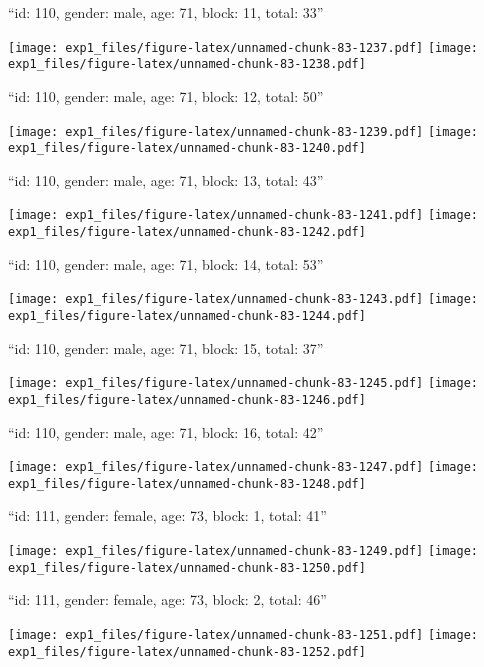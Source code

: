 \documentclass[11pt,,]{article}
\begin{document}
\newpage
[1] 

``id: 110, gender: male, age: 71, block: 11, total: 33''

\texttt{[image: exp1\_files/figure-latex/unnamed-chunk-83-1237.pdf]}
\texttt{[image: exp1\_files/figure-latex/unnamed-chunk-83-1238.pdf]}

\newpage
[1] 

``id: 110, gender: male, age: 71, block: 12, total: 50''

\texttt{[image: exp1\_files/figure-latex/unnamed-chunk-83-1239.pdf]}
\texttt{[image: exp1\_files/figure-latex/unnamed-chunk-83-1240.pdf]}

\newpage
[1] 

``id: 110, gender: male, age: 71, block: 13, total: 43''

\texttt{[image: exp1\_files/figure-latex/unnamed-chunk-83-1241.pdf]}
\texttt{[image: exp1\_files/figure-latex/unnamed-chunk-83-1242.pdf]}

\newpage
[1] 

``id: 110, gender: male, age: 71, block: 14, total: 53''

\texttt{[image: exp1\_files/figure-latex/unnamed-chunk-83-1243.pdf]}
\texttt{[image: exp1\_files/figure-latex/unnamed-chunk-83-1244.pdf]}

\newpage
[1] 

``id: 110, gender: male, age: 71, block: 15, total: 37''

\texttt{[image: exp1\_files/figure-latex/unnamed-chunk-83-1245.pdf]}
\texttt{[image: exp1\_files/figure-latex/unnamed-chunk-83-1246.pdf]}

\newpage
[1] 

``id: 110, gender: male, age: 71, block: 16, total: 42''

\texttt{[image: exp1\_files/figure-latex/unnamed-chunk-83-1247.pdf]}
\texttt{[image: exp1\_files/figure-latex/unnamed-chunk-83-1248.pdf]}

\newpage
[1] 

``id: 111, gender: female, age: 73, block: 1, total: 41''

\texttt{[image: exp1\_files/figure-latex/unnamed-chunk-83-1249.pdf]}
\texttt{[image: exp1\_files/figure-latex/unnamed-chunk-83-1250.pdf]}

\newpage
[1] 

``id: 111, gender: female, age: 73, block: 2, total: 46''

\texttt{[image: exp1\_files/figure-latex/unnamed-chunk-83-1251.pdf]}
\texttt{[image: exp1\_files/figure-latex/unnamed-chunk-83-1252.pdf]}
\end{document}
